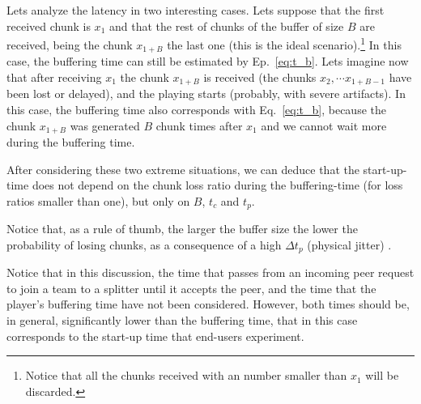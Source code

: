 Lets analyze the latency in two interesting cases. Lets suppose that
the first received chunk is $x_1$ and that the rest of chunks of the
buffer of size $B$ are received, being the chunk $x_{1+B}$ the last
one (this is the ideal scenario).\footnote{Notice that all the chunks
  received with an number smaller than $x_1$ will be discarded.} In
this case, the buffering time can still be estimated by
Ep.~\ref{eq:t_b}. Lets imagine now that after receiving $x_1$ the
chunk $x_{1+B}$ is received (the chunks $x_2, \cdots x_{1+B-1}$ have
been lost or delayed), and the playing starts (probably, with severe
artifacts). In this case, the buffering time also corresponds with
Eq.~\ref{eq:t_b}, because the chunk $x_{1+B}$ was generated $B$ chunk
times after $x_1$ and we cannot wait more during the buffering time.

After considering these two extreme situations, we can deduce that the
start-up-time does not depend on the chunk loss ratio during the
buffering-time (for loss ratios smaller than one), but only on $B$,
$t_c$ and $t_p$.

Notice that, as a rule of thumb, the larger the
buffer size the lower the probability of losing chunks, as a
consequence of a high $\Delta t_p$ (physical jitter) .

Notice that in this discussion, the time that passes from an incoming
peer request to join a team to a splitter until it accepts the peer,
and the time that the player's buffering time have not been
considered. However, both times should be, in general, significantly
lower than the buffering time, that in this case corresponds to the
start-up time that end-users experiment.


